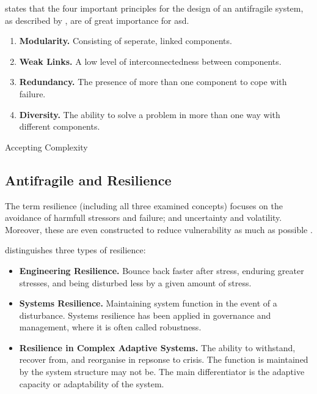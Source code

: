 \textcite[p. 886]{OReilly2019} states that the four important principles for the design of an \gls{antifragile} system, as described by \textcite[p. 35-39]{Hole2016}, are of great importance for \acrshort{asd}.
\begin{enumerate}
	\item{\textbf{Modularity.} Consisting of seperate, linked components.}
	\item{\textbf{Weak Links.} A low level of interconnectedness between components.}
	\item{\textbf{Redundancy.} The presence of more than one component to cope with failure.}
	\item{\textbf{Diversity.} The ability to solve a problem in more than one way with different components.}
\end{enumerate}

Accepting Complexity 
\newpage
\subsection{Antifragile and Resilience}
\label{sub:tbresilience}


The term resilience (including all three examined concepts) focuses on the avoidance of harmfull stressors and failure; and uncertainty and volatility. Moreover, these are even constructed to reduce vulnerability as much as possible \parencite{MartinBreen2011}.

\textcite[p. 5-7]{MartinBreen2011} distinguishes three types of resilience:
\begin{itemize}
	\item{\textbf{Engineering Resilience.} Bounce back faster after stress, enduring greater stresses, and being disturbed less by a given amount of stress.}
	\item{\textbf{Systems Resilience.} Maintaining system function in the event of a disturbance. Systems resilience has been applied in governance and management, where it is often called robustness.}
	\item{\textbf{Resilience in Complex Adaptive Systems.} The ability to withstand, recover from, and reorganise in repsonse to crisis. The function is maintained by the system structure may not be. The main differentiator is the adaptive capacity or adaptability of the system.}
\end{itemize}


